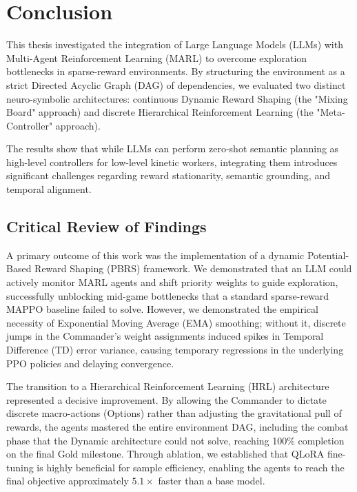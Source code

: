 \section{Conclusion}
\label{ch:conclusion}

This thesis investigated the integration of Large Language Models (LLMs) with Multi-Agent Reinforcement Learning (MARL) to overcome exploration bottlenecks in sparse-reward environments. By structuring the environment as a strict Directed Acyclic Graph (DAG) of dependencies, we evaluated two distinct neuro-symbolic architectures: continuous Dynamic Reward Shaping (the "Mixing Board" approach) and discrete Hierarchical Reinforcement Learning (the "Meta-Controller" approach). 

The results show that while LLMs can perform zero-shot semantic planning as high-level controllers for low-level kinetic workers, integrating them introduces significant challenges regarding reward stationarity, semantic grounding, and temporal alignment.

\subsection{Critical Review of Findings}
\label{sec:critical_assessment}

A primary outcome of this work was the implementation of a dynamic Potential-Based Reward Shaping (PBRS) framework. We demonstrated that an LLM could actively monitor MARL agents and shift priority weights to guide exploration, successfully unblocking mid-game bottlenecks that a standard sparse-reward MAPPO baseline failed to solve. However, we demonstrated the empirical necessity of Exponential Moving Average (EMA) smoothing; without it, discrete jumps in the Commander's weight assignments induced spikes in Temporal Difference (TD) error variance, causing temporary regressions in the underlying PPO policies and delaying convergence. 

The transition to a Hierarchical Reinforcement Learning (HRL) architecture represented a decisive improvement. By allowing the Commander to dictate discrete macro-actions (Options) rather than adjusting the gravitational pull of rewards, the agents mastered the entire environment DAG, including the combat phase that the Dynamic architecture could not solve, reaching 100\% completion on the final Gold milestone. Through ablation, we established that QLoRA fine-tuning is highly beneficial for sample efficiency, enabling the agents to reach the final objective approximately $5.1\times$ faster than a base model.

